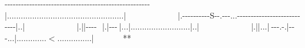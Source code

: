 -{}-{}-{}-{}-{}-{}-{}-{}-{}-{}-{}-{}-{}-{}-{}-{}-{}-{}-{}-{}-{}-{}-{}-{}-{}-{}-{}-{}-{}-{}-{}-{}-{}-{}-{}-{}-{}-{}-{}-{}-{}-{}-{}-{}-{}-{}-{}-{}-{}-{}-{}-{}-{}{\mbox{$~$}}{\mbox{$~$}}{\mbox{$~$}}{\mbox{$~$}}{\mbox{$~$}}{\mbox{$~$}}{\mbox{$~$}}{\mbox{$~$}}{\mbox{$~$}}{\mbox{$~$}}{\mbox{$~$}}{\mbox{$~$}}{\mbox{$~$}}{\mbox{$~$}}{\mbox{$~$}}{\mbox{$~$}}{\mbox{$~$}}{\mbox{$~$}}{\mbox{$~$}}{\mbox{$~$}}{\mbox{$~$}}{\mbox{$~$}}{\mbox{$~$}}{\mbox{$~$}}$\text{ }$\newline{}
\allowbreak{}|...................................................\allowbreak{}|{\mbox{$~$}}{\mbox{$~$}}{\mbox{$~$}}{\mbox{$~$}}{\mbox{$~$}}{\mbox{$~$}}{\mbox{$~$}}{\mbox{$~$}}{\mbox{$~$}}{\mbox{$~$}}{\mbox{$~$}}{\mbox{$~$}}{\mbox{$~$}}{\mbox{$~$}}{\mbox{$~$}}{\mbox{$~$}}{\mbox{$~$}}{\mbox{$~$}}{\mbox{$~$}}{\mbox{$~$}}{\mbox{$~$}}{\mbox{$~$}}{\mbox{$~$}}{\mbox{$~$}}$\text{ }$\newline{}
\allowbreak{}|.-{}-{}-{}-{}-{}-{}-{}-{}-{}-{}S\footnotemark[94]-{}-{}.-{}-{}-{}...-{}-{}-{}-{}-{}-{}-{}-{}-{}-{}-{}-{}-{}-{}-{}-{}-{}-{}-{}-{}-{}-{}-{}-{}-{}-{}-{}\allowbreak{}|..\allowbreak{}|{\mbox{$~$}}{\mbox{$~$}}{\mbox{$~$}}{\mbox{$~$}}{\mbox{$~$}}{\mbox{$~$}}{\mbox{$~$}}{\mbox{$~$}}{\mbox{$~$}}{\mbox{$~$}}{\mbox{$~$}}{\mbox{$~$}}{\mbox{$~$}}{\mbox{$~$}}{\mbox{$~$}}{\mbox{$~$}}{\mbox{$~$}}{\mbox{$~$}}{\mbox{$~$}}{\mbox{$~$}}{\mbox{$~$}}{\mbox{$~$}}{\mbox{$~$}}{\mbox{$~$}}$\text{ }$\newline{}
\allowbreak{}|.\allowbreak{}|\allowbreak{}|-{}-{}-{}-{}{\mbox{$~$}}{\mbox{$~$}}{\mbox{$~$}}\allowbreak{}|.\allowbreak{}|-{}-{}-{}{\mbox{$~$}}\allowbreak{}|...\allowbreak{}|..........................\allowbreak{}|..\allowbreak{}|{\mbox{$~$}}{\mbox{$~$}}{\mbox{$~$}}{\mbox{$~$}}{\mbox{$~$}}{\mbox{$~$}}{\mbox{$~$}}{\mbox{$~$}}{\mbox{$~$}}{\mbox{$~$}}{\mbox{$~$}}{\mbox{$~$}}{\mbox{$~$}}{\mbox{$~$}}{\mbox{$~$}}{\mbox{$~$}}{\mbox{$~$}}{\mbox{$~$}}{\mbox{$~$}}{\mbox{$~$}}{\mbox{$~$}}{\mbox{$~$}}{\mbox{$~$}}{\mbox{$~$}}$\text{ }$\newline{}
\allowbreak{}|.\allowbreak{}|\allowbreak{}|...\allowbreak{}|{\mbox{$~$}}-{}-{}-{}.-{}.\allowbreak{}|-{}-{}-{}...\allowbreak{}|.............{\mbox{$<$}}\footnotemark[95]...............\allowbreak{}|{\mbox{$~$}}{\mbox{$~$}}{\mbox{$~$}}{\mbox{$~$}}{\mbox{$~$}}{\mbox{$~$}}{\mbox{$~$}}{\mbox{$~$}}{\mbox{$~$}}{\mbox{$~$}}{\mbox{$~$}}{\mbox{$~$}}{\mbox{$~$}}{\mbox{$~$}}{\mbox{$~$}}{\mbox{$~$}}**{\mbox{$~$}}{\mbox{$~$}}{\mbox{$~$}}{\mbox{$~$}}{\mbox{$~$}}{\mbox{$~$}}$\text{ }$\newline{}
